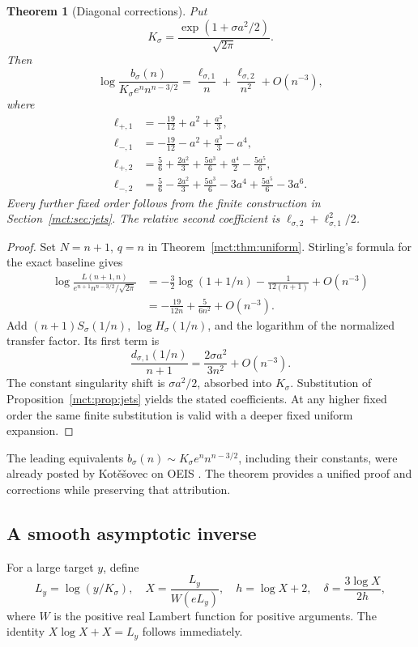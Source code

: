 \documentclass[11pt]{article}
\newtheorem{theorem}{Theorem}[section]
\theoremstyle{definition}
\begin{document}
\begin{theorem}[Diagonal corrections]\label{mct:thm:diagonal}
Put
\[
 K_\sigma=\frac{\exp(1+\sigma a^2/2)}{\sqrt{2\pi}}.
\]
Then
\begin{equation}\label{mct:eq:diagonal}
 \log\frac{b_\sigma(n)}{K_\sigma e^n n^{n-3/2}}
 =\frac{\ell_{\sigma,1}}n+\frac{\ell_{\sigma,2}}{n^2}+O(n^{-3}),
\end{equation}
where
\begin{align}
 \ell_{+,1}&=-\frac{19}{12}+a^2+\frac{a^3}{3},\\
 \ell_{-,1}&=-\frac{19}{12}-a^2+\frac{a^3}{3}-a^4,\\
 \ell_{+,2}&=\frac56+\frac{2a^2}{3}+\frac{5a^3}{6}+\frac{a^4}{2}-\frac{5a^5}{6},\\
 \ell_{-,2}&=\frac56-\frac{2a^2}{3}+\frac{5a^3}{6}-3a^4+\frac{5a^5}{6}-3a^6.
\end{align}
Every further fixed order follows from the finite construction in Section~\ref{mct:sec:jets}. The relative second coefficient is $\ell_{\sigma,2}+\ell_{\sigma,1}^2/2$.
\end{theorem}
\begin{proof}
Set $N=n+1$, $q=n$ in Theorem~\ref{mct:thm:uniform}. Stirling's formula for the exact baseline gives
\begin{align*}
 \log\frac{L(n+1,n)}{e^{n+1}n^{n-3/2}/\sqrt{2\pi}}
 &=-\frac32\log(1+1/n)-\frac{1}{12(n+1)}+O(n^{-3})\\
 &=-\frac{19}{12n}+\frac{5}{6n^2}+O(n^{-3}).
\end{align*}
Add $(n+1)S_\sigma(1/n)$, $\log H_\sigma(1/n)$, and the logarithm of the normalized transfer factor. Its first term is
\[
 \frac{d_{\sigma,1}(1/n)}{n+1}=\frac{2\sigma a^2}{3n^2}+O(n^{-3}).
\]
The constant singularity shift is $\sigma a^2/2$, absorbed into $K_\sigma$. Substitution of Proposition~\ref{mct:prop:jets} yields the stated coefficients. At any higher fixed order the same finite substitution is valid with a deeper fixed uniform expansion.
\end{proof}
The leading equivalents $b_\sigma(n)\sim K_\sigma e^n n^{n-3/2}$, including their constants, were already posted by Kot\v e\v sovec on OEIS \cite{oeisdiagall,oeisdiagid}. The theorem provides a unified proof and corrections while preserving that attribution.

\subsection{A smooth asymptotic inverse}
For a large target $y$, define
\[
 L_y=\log(y/K_\sigma),\quad
 X=\frac{L_y}{W(eL_y)},\quad h=\log X+2,\quad
 \delta=\frac{3\log X}{2h},
\]
where $W$ is the positive real Lambert function for positive arguments. The identity $X\log X+X=L_y$ follows immediately.
\end{document}
